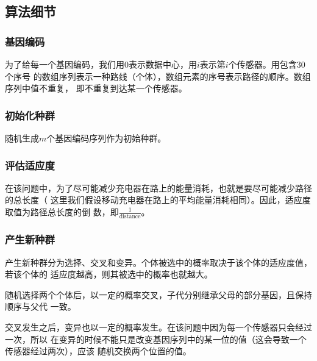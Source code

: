 \documentclass{ctexart}
\begin{document}
    \subsection{算法细节}
    \subsubsection{基因编码}
    为了给每一个基因编码，我们用0表示数据中心，用$i$表示第$i$个传感器。用包含30个序号
    的数组序列表示一种路线（个体），数组元素的序号表示路径的顺序。数组序列中值不重复，
    即不重复到达某一个传感器。
    \subsubsection{初始化种群}
    随机生成$m$个基因编码序列作为初始种群。
    \subsubsection{评估适应度}
    在该问题中，为了尽可能减少充电器在路上的能量消耗，也就是要尽可能减少路径的总长度（
    这里我们假设移动充电器在路上的平均能量消耗相同）。因此，适应度取值为路径总长度的倒
    数，即$\frac{1}{\mbox{distance}}$。
    \subsubsection{产生新种群}
    产生新种群分为选择、交叉和变异。个体被选中的概率取决于该个体的适应度值，若该个体的
    适应度越高，则其被选中的概率也就越大。

    随机选择两个个体后，以一定的概率交叉，子代分别继承父母的部分基因，且保持顺序与父代
    一致。

    交叉发生之后，变异也以一定的概率发生。在该问题中因为每一个传感器只会经过一次，所以
    在变异的时候不能只是改变基因序列中的某一位的值（这会导致一个传感器经过两次），应该
    随机交换两个位置的值。
\end{document}
